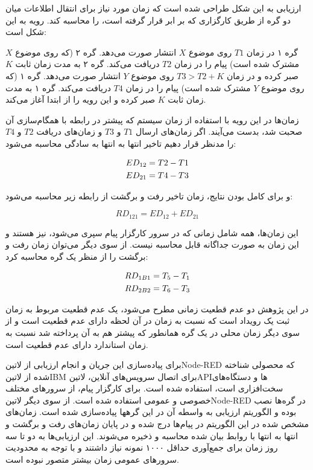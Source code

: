 ارزیابی به این شکل طراحی شده است که زمان مورد نیاز برای انتقال اطلاعات میان دو گره از طریق کارگزاری که بر ابر قرار گرفته است، را محاسبه کند.
رویه به این شکل است:

 گره ۱ در زمان $T1$ روی موضوع $X$ انتشار صورت می‌دهد.
 گره ۲ (که روی موضوع $X$ مشترک شده است) پیام را در زمان $T2$ دریافت می‌کند.
 گره ۲ به مدت زمان ثابت $K$ صبر کرده و در زمان $T3>T2+K$ روی موضوع $Y$ انتشار صورت می‌دهد.
 گره ۱ (که روی موضوع $Y$ مشترک شده است) پیام را در زمان $T4$ دریافت می‌کند.
 گره ۱ به مدت زمان ثابت $K$ صبر کرده و این رویه را از ابتدا آغاز می‌کند.

زمان‌ها در این رویه با استفاده از زمان سیستم که پیشتر در رابطه با همگام‌سازی آن صحبت شد، بدست می‌آیند.
اگر زمان‌های ارسال $T1$ و $T3$ و زمان‌های دریافت $T2$ و $T4$ را مدنظر قرار دهیم تاخیر انتها به انتها به سادگی محاسبه می‌شود:

\begin{align}
  ED_{12} = T2 - T1 \notag \\
  ED_{21} = T4 - T3 \notag
\end{align}

و برای کامل بودن نتایج، زمان تاخیر رفت و برگشت از رابطه زیر محاسبه می‌شود:

\[
  RD_{121} = ED_{12} + ED_{21}
\]

این زمان‌ها، همه شامل زمانی که در سرور کارگزار پیام سپری می‌شود، نیز هستند و این زمان به صورت جداگانه قابل محاسبه نیست.
از سوی دیگر می‌توان زمان رفت و برگشت را از منظر یک گره محاسبه کرد:

\begin{align}
  RD_{1B1} = T_{5} - T_{1} \notag \\
  RD_{2B2} = T_{6} - T_{3} \notag
\end{align}

در این پژوهش دو عدم قطعیت زمانی مطرح می‌شود، یک عدم قطعیت مربوط به زمان ثبت یک رویداد است که نسبت به زمان در آن لحظه دارای عدم قطعیت است و از سوی
دیگر زمان محلی در یک گره همانطور که پیشتر هم به آن پرداخته شد نسبت به زمان استاندارد دارای عدم قطعیت است.

برای پیاده‌سازی این جریان و انجام ارزیابی از ‌لاتین{Node-RED} که محصولی شناخته شده از ‌لاتین{IBM} برای اتصال سرویس‌های آنلاین، ‌لاتین{API}ها و
دستگاه‌های سخت‌افزاری است، استفاده شده است. برای کارگزار پیام، از سرور‌های مختلف خصوصی و عمومی استفاده شده است.
از سوی دیگر ‌لاتین{Node-RED} در گره‌ها نصب بوده و الگوریتم ارزیابی به واسطه آن در این گرهها پیاده‌سازی شده است.
زمان‌های مشخص شده در این الگوریتم در پیام‌ها درج شده و در پایان زمان‌های رفت و برگشت و انتها به انتها با روابط بیان شده محاسبه و ذخیره می‌شوند.
این ارزیابی‌ها به دو تا سه روز زمان برای جمع‌آوری حداقل ۱۰۰۰ نمونه نیاز داشتند و با توجه به محدودیت سرورهای عمومی زمان بیشتر متصور نبوده است.

